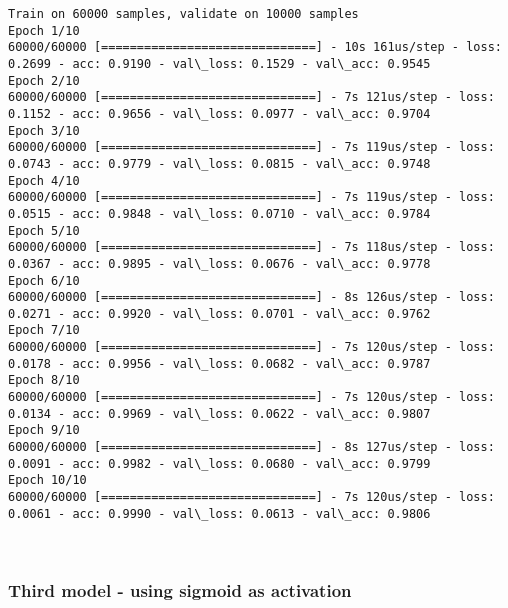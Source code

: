 \documentclass[11pt]{article}
\begin{document}
    \begin{Verbatim}[commandchars=\\\{\}]
Train on 60000 samples, validate on 10000 samples
Epoch 1/10
60000/60000 [==============================] - 10s 161us/step - loss: 0.2699 - acc: 0.9190 - val\_loss: 0.1529 - val\_acc: 0.9545
Epoch 2/10
60000/60000 [==============================] - 7s 121us/step - loss: 0.1152 - acc: 0.9656 - val\_loss: 0.0977 - val\_acc: 0.9704
Epoch 3/10
60000/60000 [==============================] - 7s 119us/step - loss: 0.0743 - acc: 0.9779 - val\_loss: 0.0815 - val\_acc: 0.9748
Epoch 4/10
60000/60000 [==============================] - 7s 119us/step - loss: 0.0515 - acc: 0.9848 - val\_loss: 0.0710 - val\_acc: 0.9784
Epoch 5/10
60000/60000 [==============================] - 7s 118us/step - loss: 0.0367 - acc: 0.9895 - val\_loss: 0.0676 - val\_acc: 0.9778
Epoch 6/10
60000/60000 [==============================] - 8s 126us/step - loss: 0.0271 - acc: 0.9920 - val\_loss: 0.0701 - val\_acc: 0.9762
Epoch 7/10
60000/60000 [==============================] - 7s 120us/step - loss: 0.0178 - acc: 0.9956 - val\_loss: 0.0682 - val\_acc: 0.9787
Epoch 8/10
60000/60000 [==============================] - 7s 120us/step - loss: 0.0134 - acc: 0.9969 - val\_loss: 0.0622 - val\_acc: 0.9807
Epoch 9/10
60000/60000 [==============================] - 8s 127us/step - loss: 0.0091 - acc: 0.9982 - val\_loss: 0.0680 - val\_acc: 0.9799
Epoch 10/10
60000/60000 [==============================] - 7s 120us/step - loss: 0.0061 - acc: 0.9990 - val\_loss: 0.0613 - val\_acc: 0.9806

    \end{Verbatim}

    \begin{center}
    \end{center}
    { \hspace*{\fill} \\}
    
    \subsubsection{Third model - using sigmoid as
activation}\label{third-model---using-sigmoid-as-activation}
\end{document}
